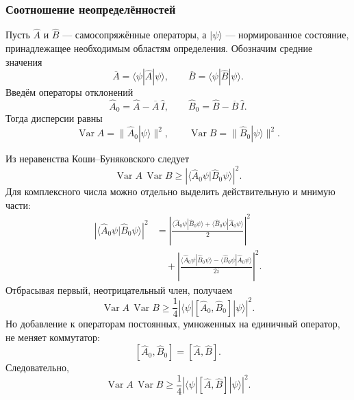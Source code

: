 \documentclass[12pt,a4paper]{article}
\begin{document}
\subsubsection{Соотношение неопределённостей}

Пусть $\hat A$ и $\hat B$ --- самосопряжённые операторы, а
$|\psi\rangle$ --- нормированное состояние, принадлежащее необходимым
областям определения. Обозначим средние значения
\[
    \overline A
    =
    \langle\psi|\hat A|\psi\rangle,
    \qquad
    \overline B
    =
    \langle\psi|\hat B|\psi\rangle.
\]
Введём операторы отклонений
\[
    \boxed{
        \hat A_0
        =
        \hat A-\overline A\,\hat I,
        \qquad
        \hat B_0
        =
        \hat B-\overline B\,\hat I
    }.
\]
Тогда дисперсии равны
\[
    \boxed{
        \operatorname{Var}A
        =
        \|\hat A_0|\psi\rangle\|^2,
        \qquad
        \operatorname{Var}B
        =
        \|\hat B_0|\psi\rangle\|^2
    }.
\]

Из неравенства Коши--Буняковского следует
\[
    \operatorname{Var}A\,
    \operatorname{Var}B
    \geq
    \left|
        \langle
            \hat A_0\psi
            |
            \hat B_0\psi
        \rangle
    \right|^2.
\]
Для комплексного числа можно отдельно выделить действительную и
мнимую части:
\begin{align*}
    \left|
        \langle\hat A_0\psi|\hat B_0\psi\rangle
    \right|^2
    &=
    \left|
        \frac{
            \langle\hat A_0\psi|\hat B_0\psi\rangle
            +
            \langle\hat B_0\psi|\hat A_0\psi\rangle
        }{2}
    \right|^2
    \\
    &\quad+
    \left|
        \frac{
            \langle\hat A_0\psi|\hat B_0\psi\rangle
            -
            \langle\hat B_0\psi|\hat A_0\psi\rangle
        }{2i}
    \right|^2.
\end{align*}
Отбрасывая первый, неотрицательный член, получаем
\[
    \operatorname{Var}A\,
    \operatorname{Var}B
    \geq
    \frac14
    \left|
        \langle\psi|
            [\hat A_0,\hat B_0]
        |\psi\rangle
    \right|^2.
\]
Но добавление к операторам постоянных, умноженных на единичный
оператор, не меняет коммутатор:
\[
    [\hat A_0,\hat B_0]
    =
    [\hat A,\hat B].
\]
Следовательно,
\[
    \boxed{
    \operatorname{Var}A\,
    \operatorname{Var}B
    \geq
    \frac14
    \left|
        \langle\psi|
            [\hat A,\hat B]
        |\psi\rangle
    \right|^2
    }.
\]
\end{document}
